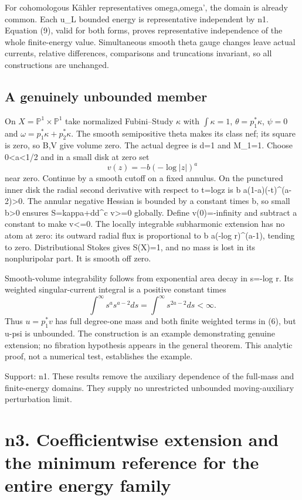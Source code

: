 \documentclass[
]{article}
\begin{document}
For cohomologous Kähler representatives omega,omega', the domain is
already common. Each u\_L bounded energy is representative independent
by n1. Equation (9), valid for both forms, proves representative
independence of the whole finite-energy value. Simultaneous smooth theta
gauge changes leave actual currents, relative differences, comparisons
and truncations invariant, so all constructions are unchanged.

\subsection{A genuinely unbounded
member}\label{a-genuinely-unbounded-member}

On \(X=\mathbb{P}^1\times\mathbb{P}^1\) take normalized Fubini--Study
\(\kappa\) with \(\int\kappa=1\), \(\theta=p_1^*\kappa\), \(\psi=0\) and
\(\omega=p_1^*\kappa+p_2^*\kappa\). The smooth semipositive theta makes
its class nef; its square is zero, so B,V give volume zero. The actual
degree is d=1 and M\_1=1. Choose 0\textless a\textless1/2 and in a small
disk at zero set \[
v(z)=-b(-\log|z|)^a
\] near zero. Continue by a smooth cutoff on a fixed annulus. On the
punctured inner disk the radial second derivative with respect to
t=log\textbar z\textbar{} is b a(1-a)(-t)\^{}(a-2)\textgreater0. The
annular negative Hessian is bounded by a constant times b, so small
b\textgreater0 ensures S=kappa+dd\^{}c v\textgreater=0 globally. Define
v(0)=-infinity and subtract a constant to make v\textless=0. The locally
integrable subharmonic extension has no atom at zero: its outward radial
flux is proportional to b a(-log r)\^{}(a-1), tending to zero.
Distributional Stokes gives S(X)=1, and no mass is lost in its
nonpluripolar part. It is smooth off zero.

Smooth-volume integrability follows from exponential area decay in
s=-log r. Its weighted singular-current integral is a positive constant
times \[
\int^\infty s^a s^{a-2}ds=\int^\infty s^{2a-2}ds<\infty.
\] Thus \(u=p_1^*v\) has full degree-one mass and both finite weighted
terms in (6), but u-psi is unbounded. The construction is an example
demonstrating genuine extension; no fibration hypothesis appears in the
general theorem. This analytic proof, not a numerical test, establishes
the example.

Support: n1. These results remove the auxiliary dependence of the
full-mass and finite-energy domains. They supply no unrestricted
unbounded moving-auxiliary perturbation limit.

\section{n3. Coefficientwise extension and the minimum reference for the
entire energy
family}\label{n3.-coefficientwise-extension-and-the-minimum-reference-for-the-entire-energy-family}
\end{document}
